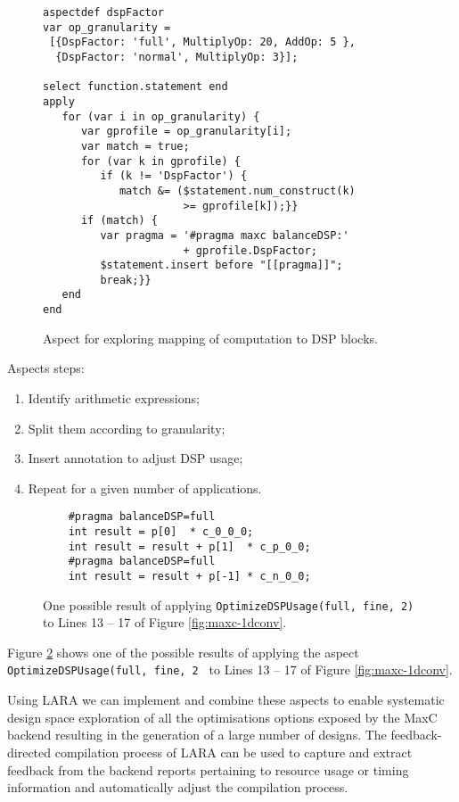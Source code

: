 \lstset{style=lara}
\begin{figure}[!h]
  \centering
  \begin{lstlisting}
aspectdef dspFactor
var op_granularity =
 [{DspFactor: 'full', MultiplyOp: 20, AddOp: 5 },
  {DspFactor: 'normal', MultiplyOp: 3}];

select function.statement end
apply
   for (var i in op_granularity) {
      var gprofile = op_granularity[i];
      var match = true;
      for (var k in gprofile) {
         if (k != 'DspFactor') {
            match &= ($statement.num_construct(k)
                      >= gprofile[k]);}}
      if (match) {
         var pragma = '#pragma maxc balanceDSP:'
                      + gprofile.DspFactor;
         $statement.insert before "[[pragma]]";
         break;}}
   end
end
  \end{lstlisting}
  \caption{Aspect for exploring mapping of computation to DSP blocks.}
  \label{fig:aspect-DSP}
\end{figure}

Aspects steps:

\begin{enumerate}
\item Identify arithmetic expressions;
\item Split them according to granularity;
\item Insert annotation to adjust DSP usage;
\item Repeat for a given number of applications.
\end{enumerate}

\begin{figure}
  \begin{lstlisting}
    #pragma balanceDSP=full
    int result = p[0]  * c_0_0_0;
    int result = result + p[1]  * c_p_0_0;
    #pragma balanceDSP=full
    int result = result + p[-1] * c_n_0_0;
  \end{lstlisting}
  \caption{One possible result of applying
    \texttt{OptimizeDSPUsage(full, fine, 2)} to Lines 13 -- 17 of Figure
    \ref{fig:maxc-1dconv}.}
  \label{fig:maxc-1dconv-aspect}
\end{figure}

Figure \ref{fig:maxc-1dconv-aspect} shows one of the possible results
of applying the aspect \texttt{OptimizeDSPUsage(full, fine, 2 } to
Lines 13 -- 17 of Figure \ref{fig:maxc-1dconv}.

Using LARA we can implement and combine these aspects to enable
systematic design space exploration of all the optimisations options
exposed by the MaxC backend resulting in the generation of a large
number of designs. The feedback-directed compilation process of LARA can
be used to capture and extract feedback from the backend reports
pertaining to resource usage or timing information and automatically
adjust the compilation process.

